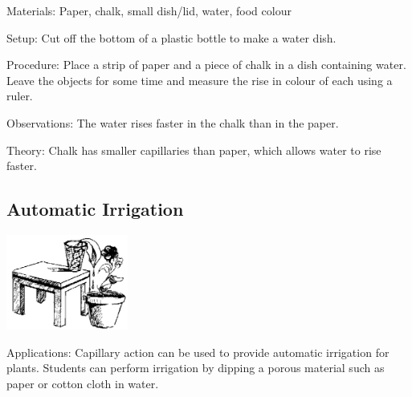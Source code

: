 \begin{multicols}{2}
\begin{description*}
\item[Materials:]{Paper, chalk, small dish/lid, water, food colour}
\item[Setup:]{Cut off the bottom of a plastic bottle to make a water dish.}
\item[Procedure:]{Place a strip of paper and a piece of chalk in a dish containing water. Leave the objects for some time and measure the rise in colour of each using a ruler.}
\item[Observations:]{The water rises faster in the chalk than in the paper.}
\item[Theory:]{Chalk has smaller capillaries than paper, which allows water to rise faster.}
\end{description*}

\subsection{Automatic Irrigation}

\begin{center}
\includegraphics[width=0.3\textwidth]{./img/source/irrigation.png}
\end{center}

\begin{description*}
\item[Applications:]{Capillary action can be used to provide automatic irrigation for plants. Students can perform irrigation by dipping a porous material such as paper or cotton cloth in water.}
\end{description*}


\end{multicols}
